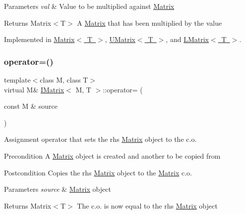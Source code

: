 \begin{DoxyParams}{Parameters}
{\em val} & Value to be multiplied against \mbox{\hyperlink{class_matrix}{Matrix}} \\
\hline
\end{DoxyParams}
\begin{DoxyReturn}{Returns}
Matrix$<$\+T$>$ A \mbox{\hyperlink{class_matrix}{Matrix}} that has been multiplied by the value 
\end{DoxyReturn}


Implemented in \mbox{\hyperlink{class_matrix_a9b987f07fb3d4fcf2b038cbfd6615650}{Matrix$<$ T $>$}}, \mbox{\hyperlink{class_u_matrix_a7b1875cfc49b374875dac2a58948f3ac}{U\+Matrix$<$ T $>$}}, and \mbox{\hyperlink{class_l_matrix_ac8df9082c434b41a98d26defb95ea388}{L\+Matrix$<$ T $>$}}.

\mbox{\label{class_i_matrix_a9eeb68de7e1d37d1aab439c78fea9be3}} 
\subsubsection{\texorpdfstring{operator=()}{operator=()}}
{\footnotesize\ttfamily template$<$class M, class T$>$ \\
virtual M\& \mbox{\hyperlink{class_i_matrix}{I\+Matrix}}$<$ M, T $>$\+::operator= (\begin{DoxyParamCaption}\item[{const M \&}]{source }\end{DoxyParamCaption})\hspace{0.3cm}{\ttfamily [pure virtual]}}



Assignment operator that sets the rhs \mbox{\hyperlink{class_matrix}{Matrix}} object to the c.\+o. 

\begin{DoxyPrecond}{Precondition}
A \mbox{\hyperlink{class_matrix}{Matrix}} object is created and another to be copied from 
\end{DoxyPrecond}
\begin{DoxyPostcond}{Postcondition}
Copies the rhs \mbox{\hyperlink{class_matrix}{Matrix}} object to the \mbox{\hyperlink{class_matrix}{Matrix}} c.\+o. 
\end{DoxyPostcond}

\begin{DoxyParams}{Parameters}
{\em source} & \mbox{\hyperlink{class_matrix}{Matrix}} object \\
\hline
\end{DoxyParams}
\begin{DoxyReturn}{Returns}
Matrix$<$\+T$>$ The c.\+o. is now equal to the rhs \mbox{\hyperlink{class_matrix}{Matrix}} object 
\end{DoxyReturn}


